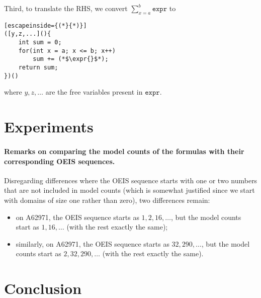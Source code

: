 \documentclass{article}
\newcommand{\expr}{\mathtt{expr}}
\begin{document}
Third, to translate the RHS, we convert $\sum_{x=a}^{b} \expr{}$ to
\begin{lstlisting}[escapeinside={(*}{*)}]
([y,z,...](){
    int sum = 0;
    for(int x = a; x <= b; x++)
        sum += (*$\expr{}$*);
    return sum;
})()
\end{lstlisting}
where $y, z, \dots$ are the free variables present in $\expr{}$.

\section{Experiments}

\paragraph{Remarks on comparing the model counts of the formulas with their
  corresponding OEIS sequences.}
Disregarding differences where the OEIS sequence starts with one or two numbers
that are not included in model counts (which is somewhat justified since we
start with domains of size one rather than zero), two differences remain:
\begin{itemize}
  \item on A62971, the OEIS sequence starts as $1, 2, 16,\dots$, but the model
        counts start as $1, 16,\dots$ (with the rest exactly the same);
  \item similarly, on A62971, the OEIS sequence starts as $32, 290,\dots$, but
        the model counts start as $2, 32, 290,\dots$ (with the rest exactly the
        same).
\end{itemize}

\section{Conclusion}



\end{document}
